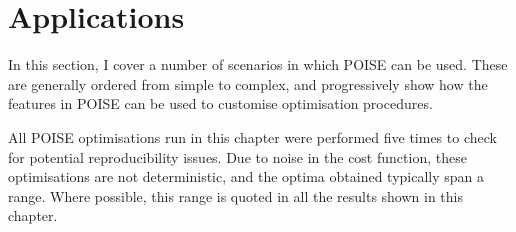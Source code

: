 \section{Applications}
\label{sec:poise__applications}

In this section, I cover a number of scenarios in which POISE can be used.
These are generally ordered from simple to complex, and progressively show how the features in POISE can be used to customise optimisation procedures.

All POISE optimisations run in this chapter were performed five times to check for potential reproducibility issues.
Due to noise in the cost function, these optimisations are not deterministic, and the optima obtained typically span a range.
Where possible, this range is quoted in all the results shown in this chapter.












